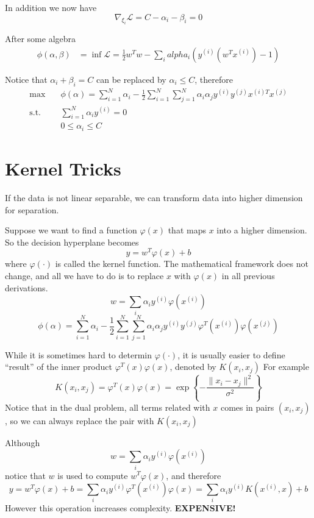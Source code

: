     In addition we now have
    \[ \nabla_{\xi_i}\mathcal{L} = C - \alpha_i - \beta_i = 0 \]

    After some algebra
    \begin{align*}
        \phi(\alpha, \beta) &= \inf\mathcal{L} = \frac{1}{2}w^Tw - \sum_i alpha_i(y^{(i)}(w^Tx^{(i)})-1)
    \end{align*}

    Notice that $\alpha_i + \beta_i = C$ can be replaced by $\alpha_i \le C$, therefore
    \begin{align*}
        \max \quad &\phi(\alpha) = \sum_{i=1}^N\alpha_i - \frac{1}{2}\sum_{i=1}^N\sum_{j=1}^N \alpha_i\alpha_j y^{(i)}y^{(j)} x^{(i)T}x^{(j)}\\
        \text{s.t.} \quad & \sum_{i=1}^N \alpha_i y^{(i)} = 0\\
        \quad & 0 \le \alpha_i \le C
    \end{align*}


\section{Kernel Tricks}
    If the data is not linear separable, we can transform data into higher dimension for separation.

    Suppose we want to find a function $\varphi(x)$ that maps $x$ into a higher dimension. So the decision hyperplane becomes
    \[ y = w^T\varphi(x) + b \]
    where $\varphi(\cdot)$ is called the kernel function.
    The mathematical framework does not change, and all we have to do is to replace $x$ with $\varphi(x)$ in all previous derivations.
    \[ w = \sum_i \alpha_i y^{(i)}\varphi(x^{(i)}) \]
    \[ \phi(\alpha) = \sum_{i=1}^N\alpha_i - \frac{1}{2}\sum_{i=1}^N\sum_{j=1}^N \alpha_i\alpha_j y^{(i)}y^{(j)} \varphi^T(x^{(i)})\varphi(x^{(j)}) \]

    While it is sometimes hard to determin $\varphi(\cdot)$, it is usually easier to define ``result'' of the inner product $\varphi^T(x)\varphi(x)$, denoted by $K(x_i, x_j)$ For example
    \[ K(x_i, x_j) = \varphi^T(x)\varphi(x) = \exp\left\{ -\frac{\|x_i-x_j\|^2}{\sigma^2} \right\} \]
    Notice that in the dual problem, all terms related with $x$ comes in pairs $(x_i,x_j)$, so we can always replace the pair with $K(x_i,x_j)$
    \begin{remark}
        Although
        \[ w = \sum_i \alpha_i y^{(i)}\varphi(x^{(i)}) \]
        notice that $w$ is used to compute $w^T \varphi(x)$, and therefore
        \[ y = w^T\varphi(x) + b = \sum_i \alpha_i y^{(i)}\varphi^T(x^{(i)})\varphi(x) = \sum_i \alpha_i y^{(i)} K(x^{(i)}, x) + b \]
        However this operation increases complexity. \textbf{EXPENSIVE!}
    \end{remark}
